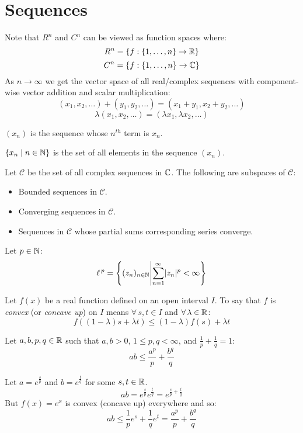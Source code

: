 \documentclass[letterpaper,12pt,fleqn]{article}
\renewcommand{\l}{\lambda}
\newcommand{\SC}{\mathcal{C}}
\newcommand{\lp}{\ell^{\,p}}
\begin{document}
\section*{Sequences}

Note that $R^n$ and $C^n$ can be viewed as function spaces where:
\[R^n=\left\{f:\{1,\ldots,n\}\to\mathbb{R}\right\}\]
\[C^n=\left\{f:\{1,\ldots,n\}\to\mathbb{C}\right\}\]
As $n\to\infty$ we get the vector space of all real/complex sequences with
component-wise vector addition and scalar multiplication:
\[(x_1,x_2,\ldots)+(y_1,y_2,\ldots)=(x_1+y_1,x_2+y_2,\ldots)\]
\[\l(x_1,x_2,\ldots)=(\l x_1,\l x_2,\ldots)\]

\begin{notation}
  $(x_n)$ is the sequence whose $n^{th}$ term is $x_n$.

  $\{x_n\mid n\in\mathbb{N}\}$ is the set of all elements in the sequence $(x_n)$.
\end{notation}

Let $\SC$ be the set of all complex sequences in $\mathbb{C}$. The following are
subspaces of $\SC$:
\begin{itemize}
\item Bounded sequences in $\SC$.
\item Converging sequences in $\SC$.
\item Sequences in $\SC$ whose partial sums corresponding series converge.
\end{itemize}

\begin{definition}[$\lp$]
  Let $p\in\mathbb{N}$:
  \[\lp=\left\{(z_n)_{n\in\N}\middle|\sum_{n=1}^{\infty}\abs{z_n}^p<\infty
  \right\}\]
\end{definition}

\begin{definition}
  Let $f(x)$ be a real function defined on an open interval $I$. To say that
  $f$ is \emph{convex} (or \emph{concave up}) on $I$ means
  $\forall\,s,t\in I$ and $\forall\,\l\in\R$:
  \[f\left((1-\l)s+\l t\right)\le(1-\l)f(s)+\l t\]
\end{definition}

\begin{theorem}
  Let $a,b,p,q\in\mathbb{R}$ such that $a,b>0$, $1\le p,q<\infty$, and
  $\frac{1}{p}+\frac{1}{q}=1$:
  \[ab\le\frac{a^p}{p}+\frac{b^q}{q}\]
\end{theorem}

\begin{theproof}
  Let $a=e^{\frac{s}{p}}$ and $b=e^{\frac{t}{q}}$ for some $s,t\in\mathbb{R}$. \\
  \[ab=e^{\frac{s}{p}}e^{\frac{t}{q}}=e^{\frac{s}{p}+\frac{t}{q}}\]
  But $f(x)=e^x$ is convex (concave up) everywhere and so:
  \[ab\le\frac{1}{p}e^s+\frac{1}{q}e^t=\frac{a^p}{p}+\frac{b^q}{q}\]
\end{theproof}
\end{document}
